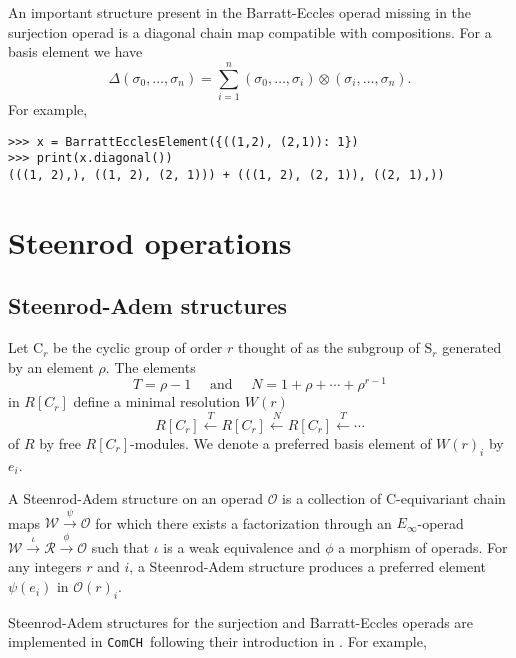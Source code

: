 \documentclass{amsart}
\newcommand{\comch}{\texttt{ComCH}}
\begin{document}
An important structure present in the Barratt-Eccles operad missing in the surjection operad is a diagonal chain map compatible with compositions. For a basis element we have
\begin{equation*}
\Delta(\sigma_0, \dots, \sigma_n) = \sum_{i=1}^n (\sigma_0, \dots, \sigma_i) \otimes (\sigma_i, \dots, \sigma_n).
\end{equation*}
For example,
\begin{verbatim}
>>> x = BarrattEcclesElement({((1,2), (2,1)): 1})
>>> print(x.diagonal())
(((1, 2),), ((1, 2), (2, 1))) + (((1, 2), (2, 1)), ((2, 1),))
\end{verbatim}

\section{Steenrod operations}

\subsection{Steenrod-Adem structures}

Let $\mathrm{C}_r$ be the cyclic group of order $r$ thought of as the subgroup of $\mathrm{S}_r$ generated by an element $\rho$. The elements
\begin{equation*}
T = \rho-1 \quad \text{ and } \quad N = 1+\rho+\cdots+\rho^{r-1}
\end{equation*}
in $R[C_r]$ define a minimal resolution $W(r)$
\begin{equation*}
R[C_r] \stackrel{T}{\longleftarrow} R[C_r] \stackrel{N}{\longleftarrow} R[C_r] \stackrel{T}{\longleftarrow} \cdots
\end{equation*}
of $R$ by free $R[C_r]$-modules. We denote
a preferred basis element of $W(r)_i$ by $e_i$.

A Steenrod-Adem structure on an operad $\mathcal O$ is a collection of $\mathrm C$-equivariant chain maps $\mathcal W \stackrel{\psi}{\longrightarrow} \mathcal O$ for which there exists a factorization through an $E_\infty$-operad $\mathcal W \stackrel{\iota}{\longrightarrow} \mathcal R \stackrel{\phi}{\longrightarrow} \mathcal O$ such that $\iota$ is a weak equivalence and $\phi$ a morphism of operads. For any integers $r$ and $i$, a Steenrod-Adem structure produces a preferred element $\psi(e_i)$ in $\mathcal O(r)_i$. 

Steenrod-Adem structures for the surjection and Barratt-Eccles operads are implemented in \comch\, following their introduction in \cite{medina2020chain}. For example,
\end{document}
